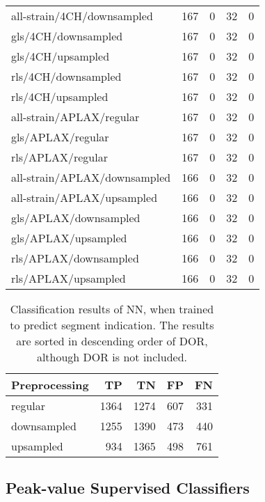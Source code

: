\begin{longtable}{lrrrr}
    all-strain/4CH/downsampled       & 167 & 0 & 32 & 0 \\
    gls/4CH/downsampled              & 167 & 0 & 32 & 0 \\
    gls/4CH/upsampled                & 167 & 0 & 32 & 0 \\
    rls/4CH/downsampled              & 167 & 0 & 32 & 0 \\
    rls/4CH/upsampled                & 167 & 0 & 32 & 0 \\
    all-strain/APLAX/regular         & 167 & 0 & 32 & 0 \\
    gls/APLAX/regular                & 167 & 0 & 32 & 0 \\
    rls/APLAX/regular                & 167 & 0 & 32 & 0 \\
    all-strain/APLAX/downsampled     & 166 & 0 & 32 & 0 \\
    all-strain/APLAX/upsampled       & 166 & 0 & 32 & 0 \\
    gls/APLAX/downsampled            & 166 & 0 & 32 & 0 \\
    gls/APLAX/upsampled              & 166 & 0 & 32 & 0 \\
    rls/APLAX/downsampled            & 166 & 0 & 32 & 0 \\
    rls/APLAX/upsampled              & 166 & 0 & 32 & 0 \\
    \hline
\end{longtable}


\begin{longtable}{lrrrr}
    \caption{Classification results of NN, when trained to predict segment indication.
             The results are sorted in descending order of DOR, although DOR is not included.}
    \label{tab:dl_segm_ind_raw_results}\\
    \hline
    Preprocessing &   TP &   TN &  FP &  FN \\
    \hline
    regular       & 1364 & 1274 & 607 & 331 \\
    downsampled   & 1255 & 1390 & 473 & 440 \\
    upsampled     &  934 & 1365 & 498 & 761 \\
    \hline
\end{longtable}

\subsection{Peak-value Supervised Classifiers}

